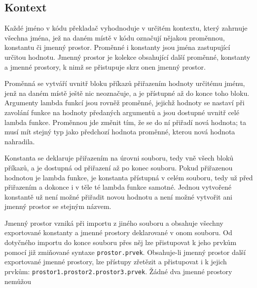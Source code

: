 \documentclass[a4paper,12pt]{article}
\begin{document}
\subsection{Kontext}
Každé jméno v kódu překladač vyhodnoduje v určitém kontextu, který zahrnuje všechna jména, jež na daném místě v kódu označují nějakou proměnnou, konstantu či jmenný prostor. Proměnné i konstanty jsou jména zastupující určitou hodnotu. Jmenný prostor je kolekce obsahující další proměnné, konstanty a jmenné prostory, k nimž se přistupuje skrz onen jmenný prostor.

Proměnná se vytváří uvnitř bloku příkazů přiřazením hodnoty určitému jménu, jenž na daném místě ještě nic neoznačuje, a je přístupné až do konce toho bloku. Argumenty lambda funkcí jsou rovněž proměnné, jejichž hodnoty se nastaví při zavolání funkce na hodnoty předaných argumentů a jsou dostupné uvnitř celé lambda funkce. Proměnnou jde změnit tím, že se do ní přiřadí nová hodnota; ta musí mít stejný typ jako předchozí hodnota proměnné, kterou nová hodnota nahradila.

Konstanta se deklaruje přiřazením na úrovni souboru, tedy vně všech bloků příkazů, a je dostupná od přiřazení až po konec souboru. Pokud přiřazenou hodnotou je lambda funkce, je konstanta přístupná v celém souboru, tedy už před přiřazením a dokonce i v těle té lambda funkce samotné. Jednou vytvořené konstantě už není možné přiřadit novou hodnotu a není možné vytvořit ani jmenný prostor se stejným názvem.

Jmenný prostor vzniká při importu z jiného souboru a obsahuje všechny exportované konstanty a jmenné prostory deklarované v onom souboru. Od dotyčného importu do konce souboru přes něj lze přistupovat k jeho prvkům pomocí již zmiňované syntaxe \texttt{prostor.prvek}. Obsahuje-li jmenný prostor další exportované jmenné prostory, lze přístupy zřetězit a přistupovat i k jejich prvkům: \texttt{prostor1.prostor2.prostor3.prvek}. Žádné dva jmenné prostory nemůžou 
\end{document}
